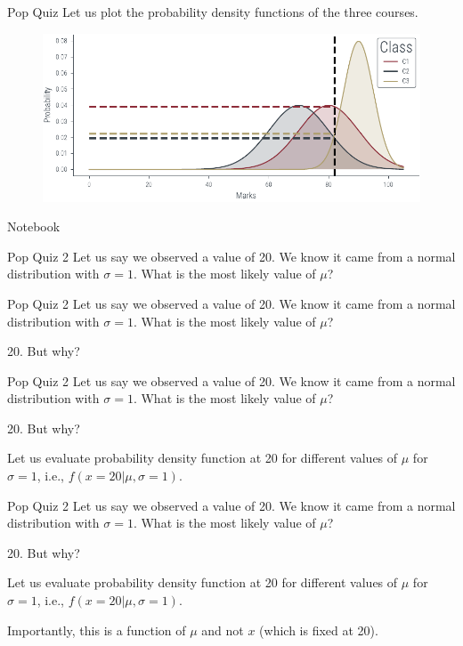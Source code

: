 \documentclass[handout]{beamer}
\begin{document}
\begin{frame}{Pop Quiz}
    Let us plot the probability density functions of the three courses. 
    \begin{figure}
        \includegraphics[width=\textwidth]{../figures/mle/mle-example-2.pdf}
    \end{figure}
    
\end{frame}

\begin{frame}
  Notebook  
\end{frame}

\begin{frame}{Pop Quiz 2}
    Let us say we observed a value of 20. We know it came from a normal distribution with $\sigma=1$. What is the most likely value of $\mu$?
    


\end{frame}

\begin{frame}{Pop Quiz 2}
    Let us say we observed a value of 20. We know it came from a normal distribution with $\sigma=1$. What is the most likely value of $\mu$?
    
    20. But why?


\end{frame}

\begin{frame}{Pop Quiz 2}
    Let us say we observed a value of 20. We know it came from a normal distribution with $\sigma=1$. What is the most likely value of $\mu$?
    
    20. But why?

    Let us evaluate probability density function at 20 for different values of $\mu$ for $\sigma=1$, i.e., $f(x=20|\mu, \sigma=1)$.


\end{frame}

\begin{frame}{Pop Quiz 2}
    Let us say we observed a value of 20. We know it came from a normal distribution with $\sigma=1$. What is the most likely value of $\mu$?
    
    20. But why?

    Let us evaluate probability density function at 20 for different values of $\mu$ for $\sigma=1$, i.e., $f(x=20|\mu, \sigma=1)$.

    Importantly, this is a function of $\mu$ and not $x$ (which is fixed at 20).

\end{frame}
\end{document}
